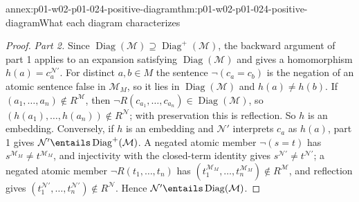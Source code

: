 \begin{annexitem}{annex:p01-w02-p01-024-positive-diagram}{thm:p01-w02-p01-024-positive-diagram}{What each diagram characterizes}
\begin{proof}
\emph{Part 2.}  Since
\(\operatorname{Diag}(\mathcal M)\supseteq\operatorname{Diag}^+(\mathcal M)\),
the backward argument of part 1 applies to an expansion satisfying
\(\operatorname{Diag}(\mathcal M)\) and gives a homomorphism
\(h(a)=c_a^{\mathcal N'}\).  For distinct \(a,b\in M\) the sentence
\(\neg(c_a=c_b)\) is the negation of an atomic sentence false in
\(\mathcal M_M\), so it lies in \(\operatorname{Diag}(\mathcal M)\) and
\(h(a)\neq h(b)\).  If \((a_1,\ldots,a_n)\notin R^{\mathcal M}\), then
\(\neg R(c_{a_1},\ldots,c_{a_n})\in\operatorname{Diag}(\mathcal M)\), so
\((h(a_1),\ldots,h(a_n))\notin R^{\mathcal N}\); with preservation this is
reflection.  So \(h\) is an embedding.  Conversely, if \(h\) is an embedding
and \(\mathcal N'\) interprets \(c_a\) as \(h(a)\), part 1 gives
\(\mathcal N'\entails\operatorname{Diag}^+(\mathcal M)\).  A negated atomic
member \(\neg(s=t)\) has \(s^{\mathcal M_M}\neq t^{\mathcal M_M}\), and
injectivity with the closed-term identity gives
\(s^{\mathcal N'}\neq t^{\mathcal N'}\); a negated atomic member
\(\neg R(t_1,\ldots,t_n)\) has
\((t_1^{\mathcal M_M},\ldots,t_n^{\mathcal M_M})\notin R^{\mathcal M}\),
and reflection gives
\((t_1^{\mathcal N'},\ldots,t_n^{\mathcal N'})\notin R^{\mathcal N}\).
Hence \(\mathcal N'\entails\operatorname{Diag}(\mathcal M)\).
\end{proof}
\end{annexitem}

